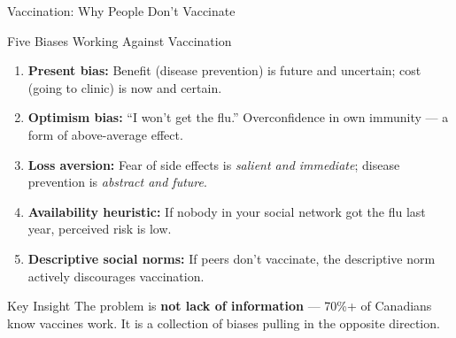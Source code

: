 \documentclass[aspectratio=169]{beamer}
\begin{document}
\begin{frame}{Vaccination: Why People Don't Vaccinate}
\begin{block}{Five Biases Working Against Vaccination}
{\small\begin{enumerate}[<+->]
  \item \textbf{Present bias:} Benefit (disease prevention) is future and uncertain; cost (going to clinic) is now and certain.
  \item \textbf{Optimism bias:} ``I won't get the flu.'' Overconfidence in own immunity --- a form of above-average effect.
  \item \textbf{Loss aversion:} Fear of side effects is \textit{salient and immediate}; disease prevention is \textit{abstract and future}.
  \item \textbf{Availability heuristic:} If nobody in your social network got the flu last year, perceived risk is low.
  \item \textbf{Descriptive social norms:} If peers don't vaccinate, the descriptive norm actively discourages vaccination.
\end{enumerate}}
\end{block}
\pause
\begin{alertblock}{Key Insight}
\small The problem is \textbf{not lack of information} --- 70\%+ of Canadians know vaccines work. It is a collection of biases pulling in the opposite direction.
\end{alertblock}
\end{frame}
\end{document}

